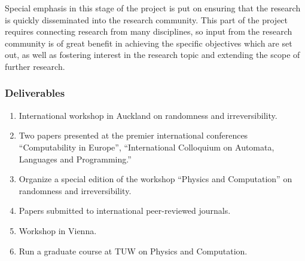 \documentclass[12pt]{article}
\begin{document}
Special emphasis in this stage of the project is put on ensuring that the research is quickly disseminated into the research community. This part of the project requires connecting research from many disciplines, so input from the research community is of great benefit in achieving the specific objectives which are set out, as well as fostering interest in the research topic and extending the scope of further research.
\fi


%
%
%





\subsubsection*{Deliverables}
\renewcommand{\labelenumi}{D3.\arabic{enumi}:}
\begin{enumerate}
\item
International workshop in Auckland on randomness and  irreversibility.

\item Two papers presented at the premier international conferences ``Computability in Europe'', ``International Colloquium on
Automata, Languages and
Programming.''

\item Organize a special edition of the workshop  ``Physics and Computation'' on randomness and irreversibility.

\item Papers  submitted to international peer-reviewed journals.
\item Workshop  in Vienna.
\item Run a graduate course at TUW on Physics and Computation.

\end{enumerate}
\end{document}
